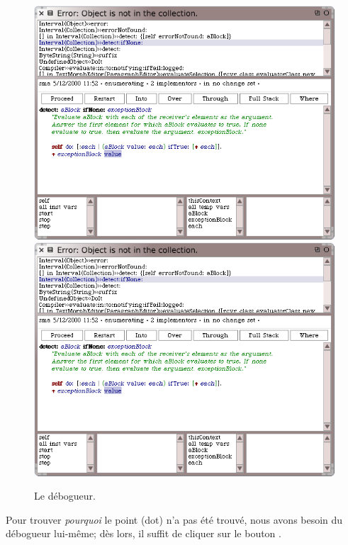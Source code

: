 \documentclass[a4paper,10pt,twoside]{book}
\begin{document}
\begin{figure}[btp]
	\begin{center}
	\ifluluelse
		{\includegraphics[width=\textwidth]{debuggerDetectIfNone}}
		{\includegraphics[scale=0.7]{debuggerDetectIfNone}}
	\end{center}
	\caption{Le d\'ebogueur.}
	\label{fig:debuggerDetectIfNone}
\end{figure}

Pour trouver \emph{pourquoi} le point (dot) n'a pas \'et\'e trouv\'e,
nous avons besoin du d\'ebogueur lui-m\^eme; d\`es lors, il suffit de
cliquer sur le bouton .

\end{document}
